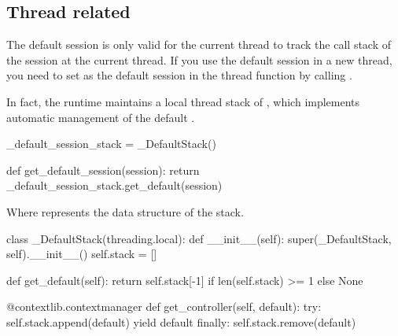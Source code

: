 \begin{content}
\subsection{Thread related}
The default session is only valid for the current thread to track the call stack of the session at the current thread. If you use the default session in a new thread, you need to set  as the default session in the thread function by calling .

In fact, the  runtime maintains a local thread stack of , which implements automatic management of the default .

\begin{leftbar}
\begin{python}
_default_session_stack = _DefaultStack()

def get_default_session(session):
  return _default_session_stack.get_default(session)
\end{python}
\end{leftbar}

Where  represents the data structure of the stack.

\begin{leftbar}
\begin{python}
class _DefaultStack(threading.local):
  def __init__(self):
    super(_DefaultStack, self).__init__()
    self.stack = []

  def get_default(self):
    return self.stack[-1] if len(self.stack) >= 1 else None

  @contextlib.contextmanager
  def get_controller(self, default):
    try:
      self.stack.append(default)
      yield default
    finally:
      self.stack.remove(default)
\end{python}
\end{leftbar}

\end{content}


